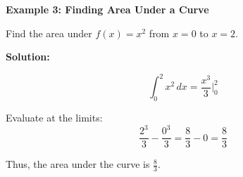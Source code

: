 \begin{flushleft}
	\textbf{Example 3: Finding Area Under a Curve}
	
	Find the area under \( f(x) = x^2 \) from \( x = 0 \) to \( x = 2 \).
	
	\textbf{Solution:} \vspace{0.2cm}
	
	\[
	\int_0^2 x^2 \,dx = \frac{x^3}{3} \Big|_0^2
	\]
	
	Evaluate at the limits:
	\[
	\frac{2^3}{3} - \frac{0^3}{3} = \frac{8}{3} - 0 = \frac{8}{3}
	\]
	
	Thus, the area under the curve is \( \boxed{\frac{8}{3}} \).
\end{flushleft}

